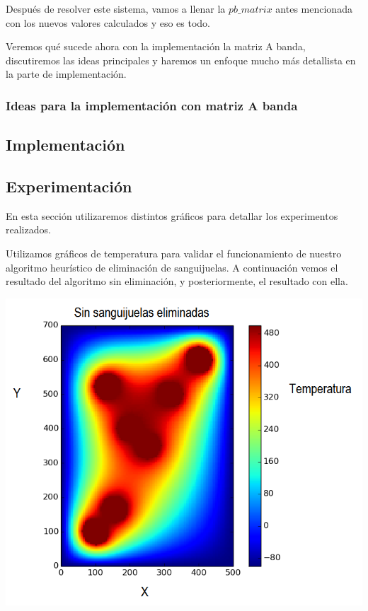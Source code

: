 \vspace{\baselineskip}

Después de resolver este sistema, vamos a llenar la $pb\_matrix$ antes mencionada con los nuevos valores calculados y eso es todo.

\vspace{\baselineskip}

\vspace{\baselineskip}
\par
Veremos qué sucede ahora con la implementación la matriz A banda, discutiremos las ideas principales y haremos un enfoque mucho más detallista en la parte de implementación.

\subsubsection{Ideas para la implementación con matriz A banda}

\subsection{Implementación}

\subsection{Experimentación}

	En esta sección utilizaremos distintos gráficos para detallar los experimentos realizados. 

	Utilizamos gráficos de temperatura para validar el funcionamiento de nuestro algoritmo heurístico de eliminación de sanguijuelas. A continuación vemos el resultado del algoritmo sin eliminación, y posteriormente, el resultado con ella.

	\begin{center}
		\includegraphics[width=\textwidth]{./img/test5_sinkill.png}
	\end{center}

